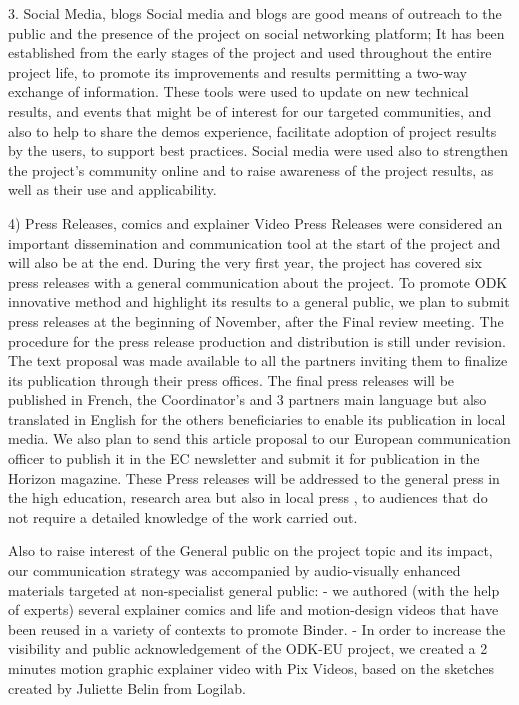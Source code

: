 3. Social Media, blogs 
Social media and blogs are good means of outreach to the public and the presence of the project on social networking platform; It has been established from the early stages of the project and used throughout the entire project life, to promote its improvements and results permitting a two-way exchange of information. These tools were used to update on new technical results, and events that might be of interest for our targeted communities, and also to help to share the demos experience, facilitate adoption of project results by the users, to support best practices.  Social media were used also to strengthen the project’s community online and to raise awareness of the project results, as well as  their use and applicability.

4) Press Releases,  comics and  explainer Video
Press Releases were considered an important dissemination and communication tool at the start of the project and will also be at the end. During the very first year, the project has covered six press releases with a general communication about the project.  To promote ODK innovative method and highlight its results to a general public, we plan to submit press releases at the beginning of November, after the Final review meeting. The procedure for the press release production and distribution is still under revision. The text proposal was made available to all the partners  inviting them to finalize its publication through their press offices. The final press releases will be published in French,  the Coordinator’s and 3 partners main language but also translated in English for the others beneficiaries to enable its publication in local media. 
We also plan to send this article proposal to our European communication officer to publish it in the EC newsletter and submit it for publication in the Horizon magazine.  These Press releases will  be  addressed  to   the general press in the high education, research area but also in local press ,  to audiences that do not require a detailed knowledge of the work carried out.  

Also to raise interest of the General public on the project topic and its impact, our communication strategy was accompanied   by   audio-visually   enhanced   materials targeted at non-specialist general public:
-	we authored (with the help of experts) several explainer comics and life and motion-design videos that have been reused in a variety of contexts to promote Binder. %
-	In  order  to increase  the  visibility  and  public  acknowledgement  of  the  ODK-EU  project,  we created a 2 minutes motion graphic explainer video with Pix Videos, based on the sketches created by Juliette Belin from Logilab.%



